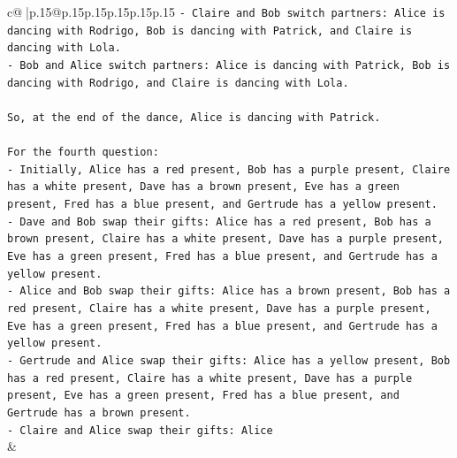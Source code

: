 \documentclass{article}
\begin{document}
{\begin{supertabular}{c@{$\;$}|p{.15\linewidth}@{}p{.15\linewidth}p{.15\linewidth}p{.15\linewidth}p{.15\linewidth}p{.15\linewidth}}
{{{\texttt{{-} Claire and Bob switch partners: Alice is dancing with Rodrigo, Bob is dancing with Patrick, and Claire is dancing with Lola.} \\
\texttt{{-} Bob and Alice switch partners: Alice is dancing with Patrick, Bob is dancing with Rodrigo, and Claire is dancing with Lola.} \\
\\ 
\texttt{So, at the end of the dance, Alice is dancing with Patrick.} \\
\\ 
\texttt{For the fourth question:} \\
\texttt{{-} Initially, Alice has a red present, Bob has a purple present, Claire has a white present, Dave has a brown present, Eve has a green present, Fred has a blue present, and Gertrude has a yellow present.} \\
\texttt{{-} Dave and Bob swap their gifts: Alice has a red present, Bob has a brown present, Claire has a white present, Dave has a purple present, Eve has a green present, Fred has a blue present, and Gertrude has a yellow present.} \\
\texttt{{-} Alice and Bob swap their gifts: Alice has a brown present, Bob has a red present, Claire has a white present, Dave has a purple present, Eve has a green present, Fred has a blue present, and Gertrude has a yellow present.} \\
\texttt{{-} Gertrude and Alice swap their gifts: Alice has a yellow present, Bob has a red present, Claire has a white present, Dave has a purple present, Eve has a green present, Fred has a blue present, and Gertrude has a brown present.} \\
\texttt{{-} Claire and Alice swap their gifts: Alice} \\
            }
        }
    }
    & \\ \\


\end{supertabular}}
\end{document}

